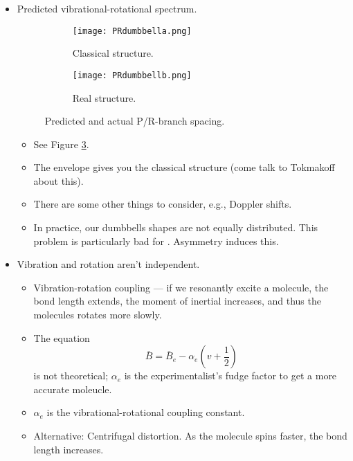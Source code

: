 \documentclass[../notes.tex]{subfiles}
\begin{document}
\begin{itemize}
\begin{itemize}
    \end{itemize}
    \item Predicted vibrational-rotational spectrum.
    \begin{figure}[h!]
        \centering
        \begin{subfigure}[b]{0.6\linewidth}
            \centering
            \texttt{[image: PRdumbbella.png]}
            \caption{Classical structure.}
            \label{fig:PRdumbbella}
        \end{subfigure}
        \begin{subfigure}[b]{0.6\linewidth}
            \centering
            \texttt{[image: PRdumbbellb.png]}
            \caption{Real structure.}
            \label{fig:PRdumbbellb}
        \end{subfigure}
        \caption{Predicted and actual P/R-branch spacing.}
        \label{fig:PRdumbbell}
    \end{figure}
    \begin{itemize}
        \item See Figure \ref{fig:PRdumbbell}.
        \item The envelope gives you the classical structure (come talk to Tokmakoff about this).
        \item There are some other things to consider, e.g., Doppler shifts.
        \item In practice, our dumbbells shapes are not equally distributed. This problem is particularly bad for . Asymmetry induces this.
    \end{itemize}
    \item Vibration and rotation aren't independent.
    \begin{itemize}
        \item Vibration-rotation coupling --- if we resonantly excite a molecule, the bond length extends, the moment of inertial increases, and thus the molecules rotates more slowly.
        \item The equation
        \begin{equation*}
            \bar{B} = \bar{B}_e-\alpha_e\left( v+\frac{1}{2} \right)
        \end{equation*}
        is not theoretical; $\alpha_e$ is the experimentalist's fudge factor to get a more accurate moleucle.
        \item $\alpha_e$ is the vibrational-rotational coupling constant.
        \item Alternative: Centrifugal distortion. As the molecule spins faster, the bond length increases.

\end{itemize}
\end{itemize}
\end{document}

